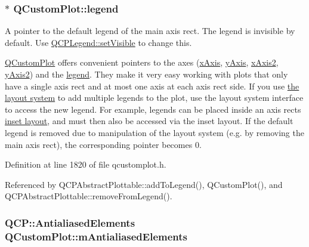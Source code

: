 \subsubsection[{legend}]{ $\ast$ Q\+Custom\+Plot\+::legend}\label{class_q_custom_plot_a4eadcd237dc6a09938b68b16877fa6af}
A pointer to the default legend of the main axis rect. The legend is invisible by default. Use \hyperlink{class_q_c_p_layerable_a3bed99ddc396b48ce3ebfdc0418744f8}{Q\+C\+P\+Legend\+::set\+Visible} to change this.

\hyperlink{class_q_custom_plot}{Q\+Custom\+Plot} offers convenient pointers to the axes (\hyperlink{class_q_custom_plot_a9a79cd0158a4c7f30cbc702f0fd800e4}{x\+Axis}, \hyperlink{class_q_custom_plot_af6fea5679725b152c14facd920b19367}{y\+Axis}, \hyperlink{class_q_custom_plot_ada41599f22cad901c030f3dcbdd82fd9}{x\+Axis2}, \hyperlink{class_q_custom_plot_af13fdc5bce7d0fabd640f13ba805c0b7}{y\+Axis2}) and the \hyperlink{class_q_custom_plot_a4eadcd237dc6a09938b68b16877fa6af}{legend}. They make it very easy working with plots that only have a single axis rect and at most one axis at each axis rect side. If you use \hyperlink{}{the layout system} to add multiple legends to the plot, use the layout system interface to access the new legend. For example, legends can be placed inside an axis rect\textquotesingle{}s \hyperlink{class_q_c_p_axis_rect_a4114887c7141b59650b7488f930993e5}{inset layout}, and must then also be accessed via the inset layout. If the default legend is removed due to manipulation of the layout system (e.\+g. by removing the main axis rect), the corresponding pointer becomes 0. 

Definition at line 1820 of file qcustomplot.\+h.



Referenced by Q\+C\+P\+Abstract\+Plottable\+::add\+To\+Legend(), Q\+Custom\+Plot(), and Q\+C\+P\+Abstract\+Plottable\+::remove\+From\+Legend().

\hypertarget{class_q_custom_plot_aa333200629256830e273873b582a5524}{}
\subsubsection[{m\+Antialiased\+Elements}]{\setlength{\rightskip}{0pt plus 5cm}Q\+C\+P\+::\+Antialiased\+Elements Q\+Custom\+Plot\+::m\+Antialiased\+Elements\hspace{0.3cm}{\ttfamily [protected]}}\label{class_q_custom_plot_aa333200629256830e273873b582a5524}


